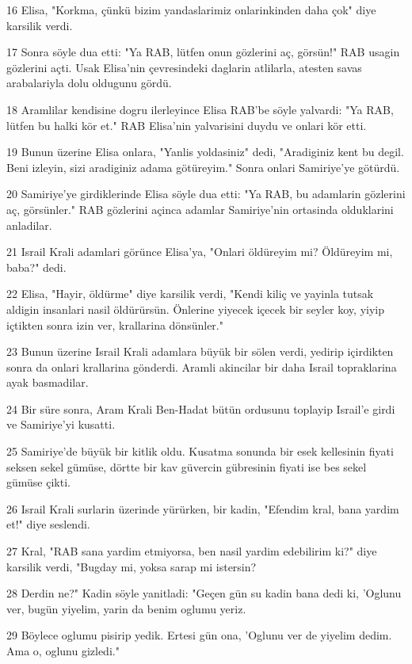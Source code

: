 \par 16 Elisa, "Korkma, çünkü bizim yandaslarimiz onlarinkinden daha çok" diye karsilik verdi.
\par 17 Sonra söyle dua etti: "Ya RAB, lütfen onun gözlerini aç, görsün!" RAB usagin gözlerini açti. Usak Elisa'nin çevresindeki daglarin atlilarla, atesten savas arabalariyla dolu oldugunu gördü.
\par 18 Aramlilar kendisine dogru ilerleyince Elisa RAB'be söyle yalvardi: "Ya RAB, lütfen bu halki kör et." RAB Elisa'nin yalvarisini duydu ve onlari kör etti.
\par 19 Bunun üzerine Elisa onlara, "Yanlis yoldasiniz" dedi, "Aradiginiz kent bu degil. Beni izleyin, sizi aradiginiz adama götüreyim." Sonra onlari Samiriye'ye götürdü.
\par 20 Samiriye'ye girdiklerinde Elisa söyle dua etti: "Ya RAB, bu adamlarin gözlerini aç, görsünler." RAB gözlerini açinca adamlar Samiriye'nin ortasinda olduklarini anladilar.
\par 21 Israil Krali adamlari görünce Elisa'ya, "Onlari öldüreyim mi? Öldüreyim mi, baba?" dedi.
\par 22 Elisa, "Hayir, öldürme" diye karsilik verdi, "Kendi kiliç ve yayinla tutsak aldigin insanlari nasil öldürürsün. Önlerine yiyecek içecek bir seyler koy, yiyip içtikten sonra izin ver, krallarina dönsünler."
\par 23 Bunun üzerine Israil Krali adamlara büyük bir sölen verdi, yedirip içirdikten sonra da onlari krallarina gönderdi. Aramli akincilar bir daha Israil topraklarina ayak basmadilar.
\par 24 Bir süre sonra, Aram Krali Ben-Hadat bütün ordusunu toplayip Israil'e girdi ve Samiriye'yi kusatti.
\par 25 Samiriye'de büyük bir kitlik oldu. Kusatma sonunda bir esek kellesinin fiyati seksen sekel gümüse, dörtte bir kav güvercin gübresinin fiyati ise bes sekel gümüse çikti.
\par 26 Israil Krali surlarin üzerinde yürürken, bir kadin, "Efendim kral, bana yardim et!" diye seslendi.
\par 27 Kral, "RAB sana yardim etmiyorsa, ben nasil yardim edebilirim ki?" diye karsilik verdi, "Bugday mi, yoksa sarap mi istersin?
\par 28 Derdin ne?" Kadin söyle yanitladi: "Geçen gün su kadin bana dedi ki, 'Oglunu ver, bugün yiyelim, yarin da benim oglumu yeriz.
\par 29 Böylece oglumu pisirip yedik. Ertesi gün ona, 'Oglunu ver de yiyelim dedim. Ama o, oglunu gizledi."
